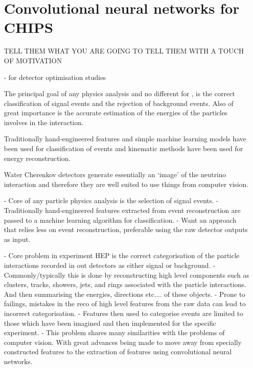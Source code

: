 \chapter{Convolutional neural networks for CHIPS} %
\label{chap:cvn} %

TELL THEM WHAT YOU ARE GOING TO TELL THEM WITH A TOUCH OF MOTIVATION

- for detector optimisation studies

The principal goal of any physics analysis and no different for \chips, is the correct
classification of signal events and the rejection of background events. Also of great importance
is the accurate estimation of the energies of the particles involves in the interaction.

Traditionally hand-engineered features and simple machine learning models have been used for
classification of events and kinematic methods have been used for energy reconstruction.

Water Cherenkov detectors generate essentially an `image' of the neutrino interaction and
therefore they are well suited to use things from computer vision.

- Core of any particle physics analysis is the selection of signal events.
- Traditionally hand-engineered features extracted from event reconstruction are passed to a
machine learning algorithm for classification.
- Want an approach that relies less on event reconstruction, preferable using the raw detector
outputs as input.

- Core problem in experiment HEP is the correct categorisation of the particle interactions
recorded in out detectors as either signal or background.
- Commonly/typically this is done by reconstructing high level components such as clusters,
tracks, showers, jets, and rings associated with the particle interactions. And then summarising
the energies, directions etc.... of these objects.
- Prone to failings, mistakes in the reco of high level features from the raw data can lead to
incorrect categorisation.
- Features then used to categorise events are limited to those which have been imagined and then
implemented for the specific experiment.
- This problem shares many similarities with the problems of computer vision. With great advances
being made to move away from specially constructed features to the extraction of features using
convolutional neural networks.

